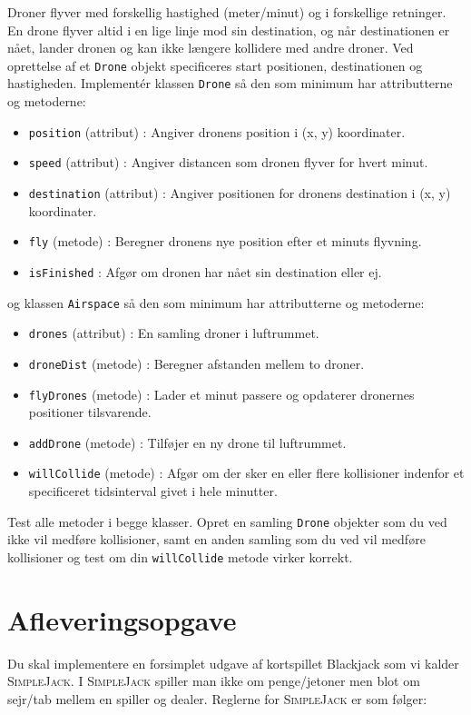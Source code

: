 \documentclass[12pt]{article}
\newcommand{\sbl}{\textsc{SimpleJack }}
\newcommand{\sblp}{\textsc{SimpleJack. }}
\begin{document}
\begin{itemize}
Droner flyver med forskellig hastighed (meter/minut) og i forskellige retninger. En drone flyver altid i en lige linje
mod sin destination, og når destinationen er nået, lander dronen og kan ikke længere kollidere med andre droner.
Ved oprettelse af et \texttt{Drone} objekt specificeres start positionen, destinationen og hastigheden.
Implementér klassen \texttt{Drone} så den som minimum har attributterne og metoderne:
\begin{itemize}
\item \texttt{position} (attribut) : Angiver dronens position i (x, y) koordinater.
\item \texttt{speed} (attribut) : Angiver distancen som dronen flyver for hvert minut.
\item \texttt{destination} (attribut) : Angiver positionen for dronens destination i (x, y) koordinater.
\item \texttt{fly} (metode) : Beregner dronens nye position efter et minuts flyvning.
\item \texttt{isFinished} : Afgør om dronen har nået sin destination eller ej.
\end{itemize}
og klassen \texttt{Airspace} så den som minimum har attributterne og metoderne:
\begin{itemize}
\item \texttt{drones} (attribut) : En samling droner i luftrummet.
\item \texttt{droneDist} (metode) : Beregner afstanden mellem to droner.
\item \texttt{flyDrones} (metode) : Lader et minut passere og opdaterer dronernes positioner tilsvarende.
\item \texttt{addDrone} (metode) : Tilføjer en ny drone til luftrummet.
\item \texttt{willCollide} (metode) : Afgør om der sker en eller flere kollisioner indenfor et specificeret tidsinterval givet
i hele minutter.
\end{itemize}
Test alle metoder i begge klasser. Opret en samling \texttt{Drone} objekter som du ved ikke vil medføre kollisioner, samt
en anden samling som du ved vil medføre kollisioner og test om din \texttt{willCollide} metode virker korrekt.
\end{itemize}
\section*{Afleveringsopgave}
Du skal implementere en forsimplet udgave af kortspillet Blackjack som vi kalder \sblp
I \sbl spiller man ikke om penge/jetoner men blot om sejr/tab mellem en spiller og dealer.
Reglerne for \sbl er som følger:
\end{document}
